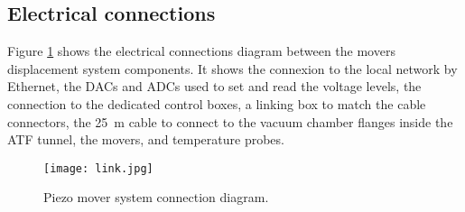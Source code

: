 \subsection{Electrical connections}
Figure \ref{f:conndiag} shows the electrical connections diagram between the movers displacement system components. It shows the connexion to the local network by Ethernet, the DACs and ADCs used to set and read the voltage levels, the connection to the dedicated control boxes, a linking box to match the cable connectors, the 25~m cable to connect to the vacuum chamber flanges inside the ATF tunnel, the movers, and temperature probes.\par
\begin{figure}[hbt]
\hspace*{1.4cm}\texttt{[image: link.jpg]}\caption{Piezo mover system connection diagram.}\label{f:conndiag}
\end{figure}
